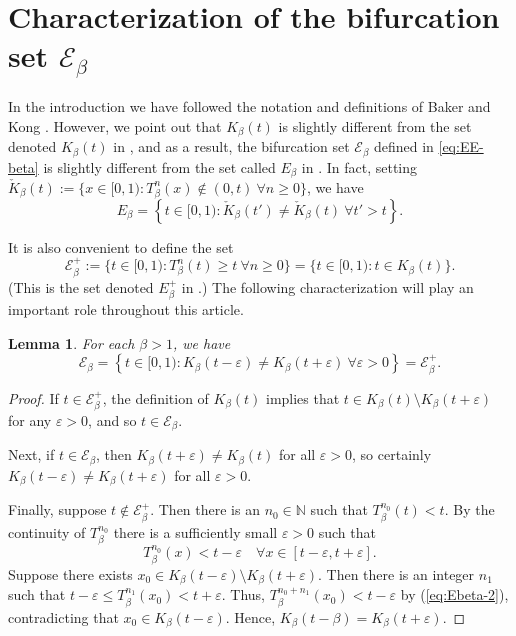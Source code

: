 \documentclass[11pt]{amsart}
\newtheorem{lemma}[theorem]{Lemma}
\theoremstyle{definition}
\theoremstyle{remark}
\numberwithin{equation}{section}
\newcommand{\N}{\ensuremath{\mathbb{N}}}
\newcommand{\EE}{\mathscr{E}}
\newcommand{\set}[1]{\left\{#1\right\}}
\newcommand{\ep}{\varepsilon}
\begin{document}
\section{Characterization of the bifurcation set $\EE_\beta$} \label{sec:E_beta}

In the introduction we have followed the notation and definitions of Baker and Kong \cite{Baker-Kong-2020}. However, we point out that $K_\beta(t)$ is slightly different from the set denoted $K_\beta(t)$ in \cite{Kalle-Kong-Langeveld-Li-18}, and as a result, the bifurcation set $\EE_\beta$ defined in \eqref{eq:EE-beta} is slightly different from the set called $E_\beta$ in \cite{Kalle-Kong-Langeveld-Li-18}. In fact, setting $\check{K}_\beta(t):=\{x\in[0,1): T_\beta^n(x)\not\in(0,t)\ \forall n\geq 0\}$, we have
\begin{equation}\label{eq:E-beta}
E_\beta=\set{t\in[0,1): \check K_\beta(t')\ne \check K_\beta(t)~\forall t'>t}.
\end{equation}

It is also convenient to define the set
\[
\EE_\beta^+:=\{t\in[0,1): T_\beta^n(t)\geq t\ \forall n\geq 0\}=\{t\in[0,1): t\in K_\beta(t)\}.
\]
(This is the set denoted $E_\beta^+$ in \cite{Kalle-Kong-Langeveld-Li-18}.) The following characterization will play an important role throughout this article.

\begin{lemma} \label{lem:E-beta-characterizations}
For each $\beta{>1}$, we have
\[
\EE_\beta=\set{t\in[0,1): K_\beta(t-\ep)\ne K_\beta(t+\ep)~\forall \ep>0}=\EE_\beta^+.
\]
\end{lemma}

\begin{proof}
If $t\in\EE_\beta^+$, the definition of $K_\beta(t)$ implies that $t\in K_\beta(t)\setminus K_\beta(t+\ep)$ for any $\ep>0$, and so $t\in\EE_\beta$.

Next, if $t\in\EE_\beta$, then $K_\beta(t+\ep)\neq K_\beta(t)$ for all $\ep>0$, so certainly $K_\beta(t-\ep)\neq K_\beta(t+\ep)$ for all $\ep>0$.

Finally, suppose $t\not\in \EE_\beta^+$. Then there is an $n_0\in\N$ such that $T_\beta^{n_0}(t)<t$. By the continuity of $T_\beta^{n_0}$ there is a sufficiently small $\ep>0$ such that
  \begin{equation} \label{eq:Ebeta-2}
    T_\beta^{n_0}(x)<t-\ep\quad\forall x\in[t-\ep, t+\ep].
  \end{equation}
  Suppose there exists $x_0\in K_\beta(t-\ep)\setminus K_\beta(t+\ep)$. Then there is an integer $n_1$ such that $t-\ep\le T_\beta^{n_1}(x_0)<t+\ep$. Thus, $T_\beta^{n_0+n_1}(x_0)<t-\ep$ by (\ref{eq:Ebeta-2}), contradicting that $x_0\in K_\beta(t-\ep)$. Hence, $K_\beta(t-\beta)=K_\beta(t+\ep)$.
\end{proof}
\end{document}
